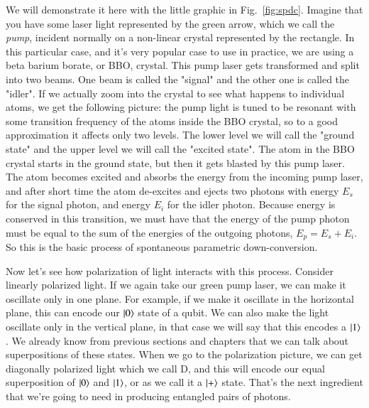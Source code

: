 We will demonstrate it here with the little graphic in Fig.~\ref{fig:spdc}. Imagine that you have some laser light
represented by the green arrow, which we call the \emph{pump}, incident normally on a non-linear crystal represented by the rectangle. In this particular case, and it's very popular case to use in practice, we are using a beta barium borate, or BBO, crystal. This pump laser gets transformed and split into two beams. One beam is called the "signal" and the other one is called the "idler". If we actually zoom into the crystal to see what happens to individual atoms, we get the following picture: the pump light is tuned to be resonant with some transition frequency of the atoms inside the BBO crystal, so to a good approximation it affects only two levels. The lower level we will call the "ground state" and the upper level we will call the "excited state". The atom in the BBO crystal starts in the ground state, but then it gets blasted by this pump laser.  The atom becomes excited and absorbs the energy from the incoming pump laser, and after short time the atom de-excites and ejects two photons with energy $E_s$ for the signal photon, and energy $E_i$ for the idler photon.  Because energy is conserved in this transition, we must have that the energy of the pump photon must be equal to the sum of the energies of the outgoing photons, $E_p = E_s + E_i$. So this is the basic process of spontaneous parametric down-conversion.

Now let's see how polarization of light interacts with this process. Consider linearly polarized light. If we again take our green pump laser, we can make it oscillate only in one plane. For example, if we make it oscillate in the horizontal plane, this can encode our $\left| 0 \right\rangle$ state of a qubit. We can also make the light oscillate only in the vertical plane, in that case we will say that this encodes a $\left| 1 \right\rangle$. We already know from previous sections and chapters that we can talk about superpositions of these states. When we go to the polarization picture, we can get diagonally polarized light which we call D, and this will encode our equal superposition of $\left| 0 \right\rangle$ and $\left| 1 \right\rangle$, or as we call it a $\left| + \right\rangle$ state. That's the next ingredient that we're going to need in producing entangled pairs of photons.

